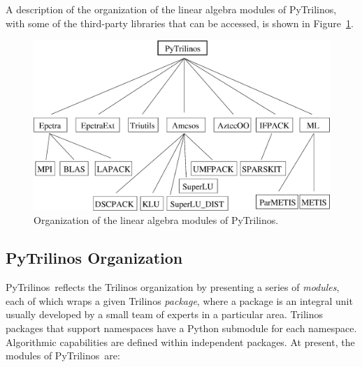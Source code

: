 \documentclass[acmtocl]{acmtrans2m}
\newcommand{\PyTrilinos}{{PyTrilinos}}
\begin{document}
A description of the organization of the linear algebra modules of
PyTrilinos, with some of the third-party libraries that can be
accessed, is shown in Figure~\ref{fig:organization}.

\begin{figure}
\begin{center}
\includegraphics[width=12cm]{organization.eps}
\caption{Organization of the linear algebra modules of PyTrilinos.}
\label{fig:organization}
\end{center}
\end{figure}

\subsection{PyTrilinos Organization}
\label{sec:organization}

\PyTrilinos\ reflects the Trilinos organization by presenting a series
of {\sl modules}, each of which wraps a given Trilinos {\sl package},
where a package is an integral unit usually developed by a small team
of experts in a particular area.  Trilinos packages that support
namespaces have a Python submodule for each namespace.  Algorithmic
capabilities are defined within independent packages. At present, the
modules of \PyTrilinos\ are:
\end{document}
